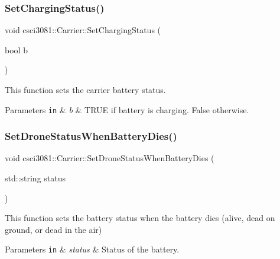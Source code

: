 \subsubsection{\texorpdfstring{Set\+Charging\+Status()}{SetChargingStatus()}}
{\footnotesize\ttfamily void csci3081\+::\+Carrier\+::\+Set\+Charging\+Status (\begin{DoxyParamCaption}\item[{bool}]{b }\end{DoxyParamCaption})}



This function sets the carrier battery status. 


\begin{DoxyParams}[1]{Parameters}
\mbox{\tt in}  & {\em b} & T\+R\+UE if battery is charging. False otherwise. \\
\hline
\end{DoxyParams}
\mbox{\label{classcsci3081_1_1Carrier_a039d932119b4b3b7e076ff9e6ffada80}} 
\subsubsection{\texorpdfstring{Set\+Drone\+Status\+When\+Battery\+Dies()}{SetDroneStatusWhenBatteryDies()}}
{\footnotesize\ttfamily void csci3081\+::\+Carrier\+::\+Set\+Drone\+Status\+When\+Battery\+Dies (\begin{DoxyParamCaption}\item[{std\+::string}]{status }\end{DoxyParamCaption})}



This function sets the battery status when the battery dies (alive, dead on ground, or dead in the air) 


\begin{DoxyParams}[1]{Parameters}
\mbox{\tt in}  & {\em status} & Status of the battery. \\
\hline
\end{DoxyParams}
\mbox{\label{classcsci3081_1_1Carrier_aede9d79fffb164f90fe30b19f2e2c854}} 
